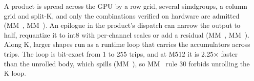 A product is spread across the GPU by a row grid, several simdgroups, a column grid and split-K, and only the
combinations verified on hardware are admitted (MM~, MM~). An epilogue in the product's dispatch
can narrow the output to half, requantize it to int8 with per-channel scales or add a residual (MM~,
MM~). Along K, larger shapes run as a runtime loop that carries the accumulators across trips. The loop is
bit-exact from 1 to 255 trips, and at M512 it is 2.25× faster than the unrolled body, which spills (MM~),
so MM~ rule 30 forbids unrolling the K loop.

